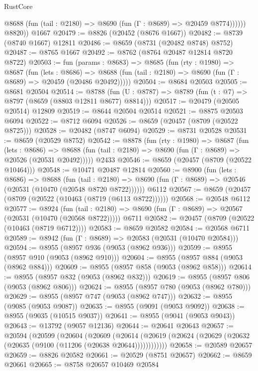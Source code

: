 \begin{lexlean}{RustCore}
\begin{coremodule}
              @8688 (fun (tail : @2180) => @8690 (fun (Γ : @8689) => @20459 @8774))))))
        @8820))
    @1667
@20479 := @8826 (@20452 (@8676 @1667))
@20482 := @8739 (@8740 @1667) @12811
@20486 := @8659 (@8731 (@20482 @8748) @8752)
@20487 := @8765 @1667
@20492 := @8762 (@8764 @20487 @12814 @8720 @8722)
@20503 := fun (params : @8683) =>
  @8685
    (fun (rty : @1980) =>
    @8687
      (fun (lets : @8686) =>
      @8688 (fun (tail : @2180) => @8690 (fun (Γ : @8689) => @20459 (@20486 @20492)))))
@20504 := @8684 @20503
@20505 := @8681 @20504
@20514 := @8788
    (fun (U : @8787) => @8789 (fun (t : @7) => @8797 (@8659 (@8803 @12811 @8677) @8814)))
@20517 := @20479 (@20505 @20514) @12809
@20519 := @8644 @20504 @20514
@20521 := @8875 @20503 @6094
@20522 := @8712 @6094
@20526 := @8659 (@20457 (@8709 (@20522 @8725)))
@20528 := @20482 (@8747 @6094)
@20529 := @8731 @20528
@20531 := @8659 (@20529 @8752)
@20542 := @8878
    (fun (rty : @1980) =>
    @8687
      (fun (lets : @8686) =>
      @8688 (fun (tail : @2180) => @8690 (fun (Γ : @8689) => @20526 (@20531 @20492)))))
    @2433
@20546 := @8659 (@20457 (@8709 (@20522 @10464)))
@20548 := @10471 @20487 @12814
@20560 := @8900
    (fun (lets : @8686) =>
    @8688
      (fun (tail : @2180) =>
      @8690 (fun (Γ : @8689) => @20546 (@20531 (@10470 (@20548 @8720 @8722))))))
    @6112
@20567 := @8659 (@20457 (@8709 (@20522 (@10463 (@8719 (@6113 @8722))))))
@20568 := @20548 @6112
@20577 := @8924
    (fun (tail : @2180) => @8690 (fun (Γ : @8689) => @20567 (@20531 (@10470 (@20568 @8722)))))
    @6711
@20582 := @20457 (@8709 (@20522 (@10463 (@8719 @6712))))
@20583 := @8659 @20582
@20584 := @20568 @6711
@20589 := @8942 (fun (Γ : @8689) => @20583 (@20531 (@10470 @20584)))
@20594 := @8955 (@8957 @936 (@9053 (@8962 @936)))
@20599 := @8955 (@8957 @910 (@9053 (@8962 @910)))
@20604 := @8955 (@8957 @884 (@9053 (@8962 @884)))
@20609 := @8955 (@8957 @858 (@9053 (@8962 @858)))
@20614 := @8955 (@8957 @832 (@9053 (@8962 @832)))
@20619 := @8955 (@8957 @806 (@9053 (@8962 @806)))
@20624 := @8955 (@8957 @780 (@9053 (@8962 @780)))
@20629 := @8955 (@8957 @747 (@9053 (@8962 @747)))
@20632 := @8955 (@9085 (@9053 @9087))
@20635 := @8955 (@9091 (@9053 @9092))
@20638 := @8955 (@9035 (@10515 @9037))
@20641 := @8955 (@9041 (@9053 @9043))
@20643 := @13792 (@9057 @12136)
@20644 := @20641 @20643
@20657 := @20594
    (@20599
      (@20604
        (@20609
          (@20614 (@20619 (@20624 (@20629 (@20632 (@20635 (@9100 (@11206 (@20638 @20644))))))))))))
@20658 := @20589 @20657
@20659 := @8826 @20582
@20661 := @20529 (@8751 @20657)
@20662 := @8659 @20661
@20665 := @8758 @20657 @10469 @20584

\end{coremodule}
\end{lexlean}
